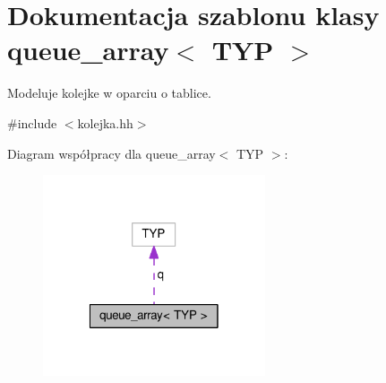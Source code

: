 \hypertarget{classqueue__array}{\section{Dokumentacja szablonu klasy queue\-\_\-array$<$ T\-Y\-P $>$}
\label{classqueue__array}
}


Modeluje kolejke w oparciu o tablice.  




{\ttfamily \#include $<$kolejka.\-hh$>$}



Diagram współpracy dla queue\-\_\-array$<$ T\-Y\-P $>$\-:\nopagebreak
\begin{figure}[H]
\begin{center}
\leavevmode
\includegraphics[width=186pt]{classqueue__array__coll__graph}
\end{center}
\end{figure}
